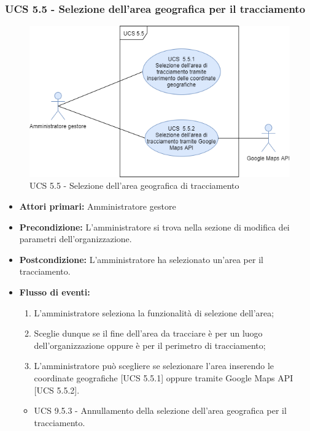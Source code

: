 \subsubsection{UCS 5.5 - Selezione dell'area geografica per il tracciamento}%
\begin{figure}[h]
	\centering
    \includegraphics[scale=0.53]{sezioni/UseCase/Immagini/UCS5.5.png}
    \caption{UCS 5.5 - Selezione dell'area geografica di tracciamento}
\end{figure}
\begin{itemize}
\item \textbf{Attori primari:} Amministratore gestore
\item \textbf{Precondizione:} L'amministratore si trova nella sezione di modifica dei parametri dell'organizzazione.
\item \textbf{Postcondizione:} L'amministratore ha selezionato un'area per il tracciamento.
\item \textbf{Flusso di eventi:}
\begin{enumerate}
    \item L'amministratore seleziona la funzionalità di selezione dell'area;
    \item Sceglie dunque se il fine dell'area da tracciare è per un luogo dell'organizzazione oppure è per il perimetro di tracciamento;
    \item L'amministratore può scegliere se selezionare l'area inserendo le coordinate geografiche [UCS 5.5.1] oppure tramite Google Maps API [UCS 5.5.2].
\end{enumerate}
\begin{itemize}
    \item UCS 9.5.3 - Annullamento della selezione dell'area geografica per il tracciamento.
\end{itemize}
\end{itemize}

